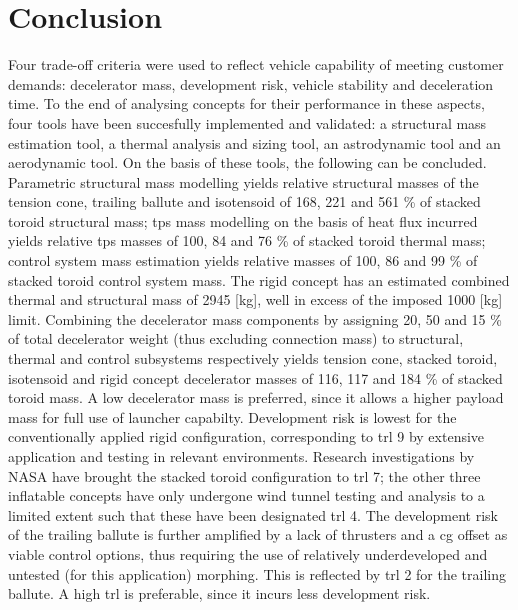 \section{Conclusion}\label{cha:conclusion}
Four trade-off criteria were used to reflect vehicle capability of meeting customer demands: decelerator mass, development risk, vehicle stability and deceleration time. To the end of analysing concepts for their performance in these aspects, four tools have been succesfully implemented and validated: a structural mass estimation tool, a thermal analysis and sizing tool, an astrodynamic tool and an aerodynamic tool. On the basis of these tools, the following can be concluded.
\newline
\newline
Parametric structural mass modelling yields relative structural masses of the tension cone, trailing ballute and isotensoid of 168, 221 and 561 \% of stacked toroid structural mass; \acrfull{tps} mass modelling on the basis of heat flux incurred yields relative \gls{tps} masses of 100, 84 and 76 \% of stacked toroid thermal mass; control system mass estimation yields relative masses of 100, 86 and 99 \% of stacked toroid control system mass. The rigid concept has an estimated combined thermal and structural mass of 2945 [kg], well in excess of the imposed 1000 [kg] limit. Combining the decelerator mass components by assigning 20, 50 and 15 \% of total decelerator weight (thus excluding connection mass) to structural, thermal and control subsystems respectively yields tension cone, stacked toroid, isotensoid and rigid concept decelerator masses of 116, 117 and 184 \% of stacked toroid mass. A low decelerator mass is preferred, since it allows a higher payload mass for full use of launcher capabilty.
\newline
\newline
Development risk is lowest for the conventionally applied rigid configuration, corresponding to \acrfull{trl} 9 by extensive application and testing in relevant environments. Research investigations by NASA have brought the stacked toroid configuration to \gls{trl} 7; the other three inflatable concepts have only undergone wind tunnel testing and analysis to a limited extent such that these have been designated \gls{trl} 4. The development risk of the trailing ballute is further amplified by a lack of thrusters and a \gls{cg} offset as viable control options, thus requiring the use of relatively underdeveloped and untested (for this application) morphing. This is reflected by \gls{trl} 2 for the trailing ballute. A high \gls{trl} is preferable, since it incurs less development risk.
